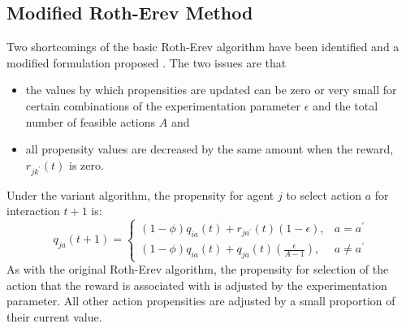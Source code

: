 \subsection{Modified Roth-Erev Method}
\label{sec:variant}
Two shortcomings of the basic Roth-Erev algorithm have been identified and a
modified formulation proposed \cite{nicolaisen:2001}.  The two issues are that
\begin{itemize}
  \item the values by which propensities are updated can be zero or very small
  for certain combinations of the experimentation parameter $\epsilon$ and
  the total number of feasible actions $A$ and
  \item all propensity values are decreased by the same amount when the reward,
  $r_{jk^\prime}(t)$ is zero.
\end{itemize}
Under the variant algorithm, the propensity for agent $j$ to select action $a$
for interaction $t+1$ is:
\begin{equation}
q_{ja}(t+1) =
\begin{cases}
(1-\phi)q_{ia}(t) + r_{ja^\prime}(t)(1-\epsilon), & \text{$a = a^\prime$} \\
(1-\phi)q_{ia}(t) + q_{ja}(t)(\frac{\epsilon}{A-1}), & \text{$a \ne
a^\prime$}
\end{cases}
\end{equation}
As with the original Roth-Erev algorithm, the propensity for selection of the
action that the reward is associated with is adjusted by the experimentation
parameter.  All other action propensities are adjusted by a small proportion of
their current value.


